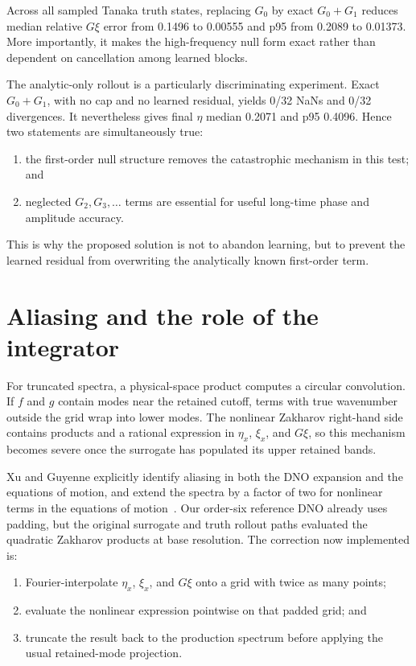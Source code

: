 \documentclass[11pt]{article}
\begin{document}
Across all sampled Tanaka truth states, replacing \(G_0\) by exact \(G_0+G_1\)
reduces median relative \(G\xi\) error from 0.1496 to 0.00555 and p95 from
0.2089 to 0.01373.  More importantly, it makes the high-frequency null form
exact rather than dependent on cancellation among learned blocks.

The analytic-only rollout is a particularly discriminating experiment.  Exact
\(G_0+G_1\), with no cap and no learned residual, yields 0/32 NaNs and 0/32
divergences.  It nevertheless gives final \(\eta\) median 0.2071 and p95
0.4096.  Hence two statements are simultaneously true:
\begin{enumerate}
  \item the first-order null structure removes the catastrophic mechanism in
        this test; and
  \item neglected \(G_2,G_3,\ldots\) terms are essential for useful long-time
        phase and amplitude accuracy.
\end{enumerate}
This is why the proposed solution is not to abandon learning, but to prevent
the learned residual from overwriting the analytically known first-order term.

\section{Aliasing and the role of the integrator}

For truncated spectra, a physical-space product computes a circular
convolution.  If \(f\) and \(g\) contain modes near the retained cutoff, terms
with true wavenumber outside the grid wrap into lower modes.  The nonlinear
Zakharov right-hand side contains products and a rational expression in
\(\eta_x\), \(\xi_x\), and \(G\xi\), so this mechanism becomes severe once the
surrogate has populated its upper retained bands.

Xu and Guyenne explicitly identify aliasing in both the DNO expansion and the
equations of motion, and extend the spectra by a factor of two for nonlinear
terms in the equations of motion~\cite[Sec.~3.3]{xu2009}.  Our order-six
reference DNO already uses padding, but the original surrogate and truth
rollout paths evaluated the quadratic Zakharov products at base resolution.
The correction now implemented is:
\begin{enumerate}
  \item Fourier-interpolate \(\eta_x\), \(\xi_x\), and \(G\xi\) onto a grid
        with twice as many points;
  \item evaluate the nonlinear expression pointwise on that padded grid; and
  \item truncate the result back to the production spectrum before applying
        the usual retained-mode projection.
\end{enumerate}
\end{document}
